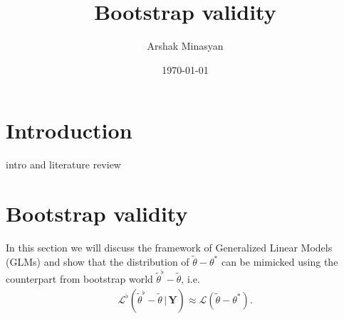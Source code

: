 \documentclass[12pt]{article}
\title{Bootstrap validity}
\author{Arshak Minasyan}
\date{\today}
\renewcommand{\=}[1]{\stackrel{#1}{=}} %
\begin{document}
\maketitle
\newpage
\section{Introduction}
intro and literature review 
\newpage 
\section{Bootstrap validity} 
In this section we will discuss the framework of Generalized Linear Models (GLMs) and show that the distribution of $\tilde{\theta} - \theta^*$ can be mimicked using the counterpart from bootstrap world $\tilde{\theta}^{\flat} - \tilde{\theta}$, i.e. 
\begin{align}
\mathcal{L}^{\flat}(\tilde{\theta}^{\flat} - \tilde{\theta} \, | \, \mathbf{Y}) \approx \mathcal{L}(\tilde{\theta} - {\theta}^*).
\end{align}
\end{document}
